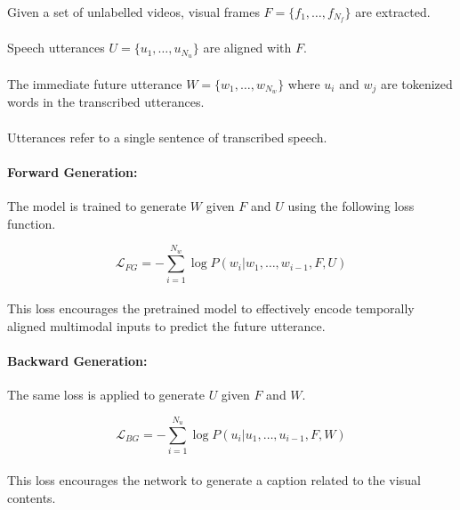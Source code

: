 \documentclass{article}
\begin{document}
\paragraph{}Given a set of unlabelled videos, visual frames $F = \{f_1,\ldots,f_{N_f}\}$ are extracted.

\paragraph{}Speech utterances $U = \{u_1,\ldots,u_{N_u}\}$ are aligned with $F$.

\paragraph{}The immediate future utterance $W = \{w_1,\ldots,w_{N_w}\}$ where $u_i$ and $w_j$ are tokenized words in
the transcribed utterances. 

\paragraph{}Utterances refer to a single sentence of transcribed speech.

\paragraph{Forward Generation:} The model is trained to generate $W$ given $F$ and $U$ using the following
loss function.


\[
    \mathcal{L}_{FG} = -\sum_{i=1}^{N_w} \log P(w_i | w_1, \ldots, w_{i-1}, F, U)
\]

\paragraph{}This loss encourages the pretrained model to effectively encode temporally
aligned multimodal inputs to predict the future utterance.

\paragraph{Backward Generation:} The same loss is applied to generate $U$ given $F$ and $W$.

\[
    \mathcal{L}_{BG} = -\sum_{i=1}^{N_u} \log P(u_i | u_1, \ldots, u_{i-1}, F, W)
\]

\paragraph{}This loss encourages the network to generate a caption related to the visual contents.
\end{document}
